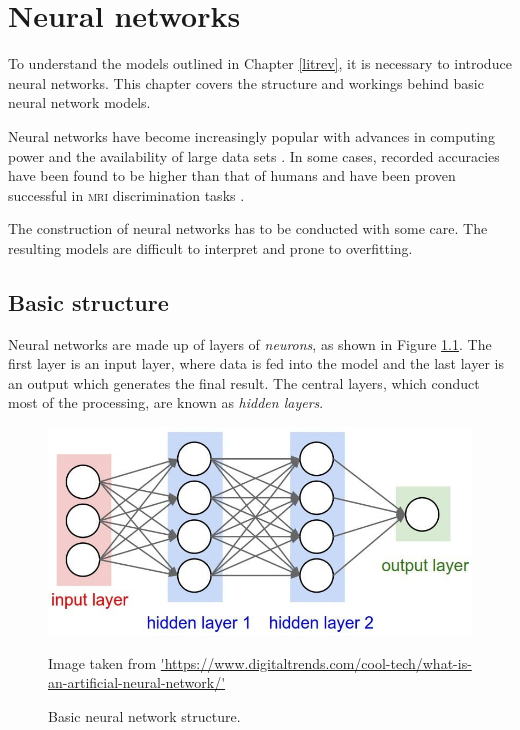 %
%

\chapter{Neural networks}\label{neuralNets-intro}

To understand the models outlined in Chapter \ref{litrev}, it is necessary to introduce neural networks. This chapter covers the structure and workings behind basic neural network models.

% 
% 

Neural networks have become increasingly popular with advances in computing power and the availability of large data sets \cite{Goodfellow-et-al-2016}. In some cases, recorded accuracies have been found to be higher than that of humans \cite{HeK2016Drlf} and have been proven successful in \textsc{mri} discrimination tasks \cite{DouQ.2016ADoC,Yokoyama2007}.

The construction of neural networks has to be conducted with some care. The resulting models are difficult to interpret and prone to overfitting. 

\section{Basic structure}\label{nnets-structure}

Neural networks are made up of layers of \textit{neurons}, as shown in Figure \ref{nnet-structurefig}. The first layer is an input layer, where data is fed into the model and the last layer is an output which generates the final result. The central layers, which conduct most of the processing, are known as \textit{hidden layers}.
\begin{figure}[ht]
	\centering
	\includegraphics[width=\textwidth]{Images/3_nnet_structure.jpg}
	\caption{Basic neural network structure.}
	\small Image taken from \url{'https://www.digitaltrends.com/cool-tech/what-is-an-artificial-neural-network/'}
	\label{nnet-structurefig}
\end{figure}


